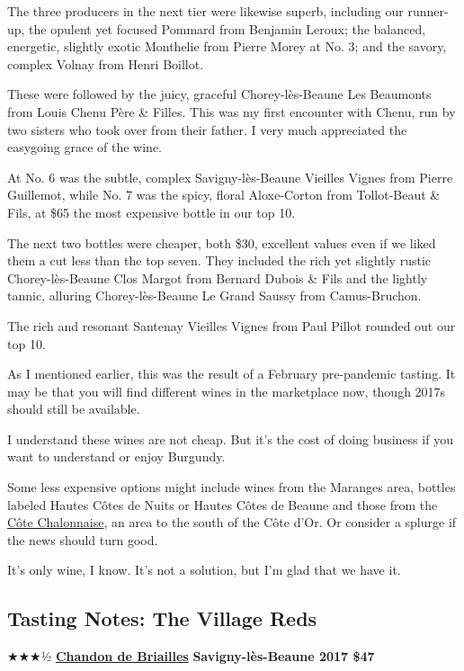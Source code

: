 The three producers in the next tier were likewise superb, including our
runner-up, the opulent yet focused Pommard from Benjamin Leroux; the
balanced, energetic, slightly exotic Monthelie from Pierre Morey at No.
3; and the savory, complex Volnay from Henri Boillot.

These were followed by the juicy, graceful Chorey-lès-Beaune Les
Beaumonts from Louis Chenu Père \& Filles. This was my first encounter
with Chenu, run by two sisters who took over from their father. I very
much appreciated the easygoing grace of the wine.

At No. 6 was the subtle, complex Savigny-lès-Beaune Vieilles Vignes from
Pierre Guillemot, while No. 7 was the spicy, floral Aloxe-Corton from
Tollot-Beaut \& Fils, at \$65 the most expensive bottle in our top 10.

The next two bottles were cheaper, both \$30, excellent values even if
we liked them a cut less than the top seven. They included the rich yet
slightly rustic Chorey-lès-Beaune Clos Margot from Bernard Dubois \&
Fils and the lightly tannic, alluring Chorey-lès-Beaune Le Grand Saussy
from Camus-Bruchon.

The rich and resonant Santenay Vieilles Vignes from Paul Pillot rounded
out our top 10.

As I mentioned earlier, this was the result of a February pre-pandemic
tasting. It may be that you will find different wines in the marketplace
now, though 2017s should still be available.

I understand these wines are not cheap. But it's the cost of doing
business if you want to understand or enjoy Burgundy.

Some less expensive options might include wines from the Maranges area,
bottles labeled Hautes Côtes de Nuits or Hautes Côtes de Beaune and
those from the
\href{https://www.nytimes3xbfgragh.onion/2019/05/09/dining/drinks/wine-school-mercurey-burgundy-red.html}{Côte
Chalonnaise}, an area to the south of the Côte d'Or. Or consider a
splurge if the news should turn good.

It's only wine, I know. It's not a solution, but I'm glad that we have
it.

\hypertarget{tasting-notes-the-village-reds}{%
\subsection{Tasting Notes: The Village
Reds}\label{tasting-notes-the-village-reds}}

★★★½ \href{http://www.chandondebriailles.com/en/}{\textbf{Chandon de
Briailles}} \textbf{Savigny-lès-Beaune 2017 \$47}

